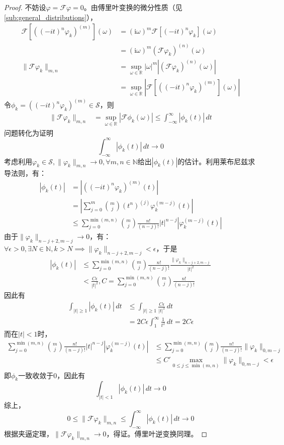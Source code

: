 \begin{proof}
    不妨设$\varphi=\mathcal{F} \varphi=0$。由傅里叶变换的微分性质（见\ref{sub:general_distributions}），
    \begin{align*}
    \mathcal{F}\left[\left((-it)^n\varphi_k\right)^{(m)}\right](\omega)&=(\mathrm{i}\omega)^m \mathcal{F}\left[(-it)^n \varphi_k\right](\omega)\\
    &=(\mathrm{i}\omega)^m (\mathcal{F} \varphi_k)^{(n)}(\omega)\\
    \|\mathcal{F} \varphi_k\|_{m,n}&=\sup_{\omega\in\mathbb{R} }|\omega|^m\left|(\mathcal{F} \varphi_k)^{(n)}(\omega)\right|\\
    &=\sup_{\omega\in\mathbb{R} }\left|\mathcal{F}\left[((-it)^n \varphi_k)^{(m)}\right](\omega)\right|
\end{align*}
令$\phi_k=\left((-it)^n \varphi_k\right)^{(m)}\in\mathcal{S} $，则
\begin{align*}
    \|\mathcal{F} \varphi_k\|_{m,n}&=\sup_{\omega\in\mathbb{R} }\left|\mathcal{F} \phi_k(\omega)\right|\leq \int_{-\infty}^{\infty}|\phi_k(t)|\,dt
\end{align*}
问题转化为证明\[\int_{-\infty}^{\infty}|\phi_k(t)|\,dt\to 0\]
考虑利用$\varphi_k\in\mathcal{S} ,\|\varphi_k\|_{m,n}\to 0,\forall m,n\in\mathbb{N}$给出$|\phi_k(t)|$的估计。利用莱布尼兹求导法则，有：
\begin{align*}
    |\phi_k(t)|&=\left|\left((-it)^n \varphi_k\right)^{(m)}(t)\right|\\
&=\left|\sum_{j=0}^{m}\binom{m}{j}(t^n)^{(j)}\varphi_k^{(m-j)}(t)\right|\\
    &\leq \sum_{j=0}^{\min(m,n)}\binom{m}{j}\frac{n!}{(n-j)!}|t|^{n-j}\left|\varphi_k^{(m-j)}(t)\right|
\end{align*}
由于$\|\varphi_k\|_{n-j+2,m-j}\to 0$，有：$\forall \epsilon>0,\exists N\in\mathbb{N},k>N\implies \|\varphi_k\|_{n-j+2,m-j}<\epsilon$，于是
\begin{align*}
    |\phi_k(t)|&\leq \sum_{j=0}^{\min(m,n)}\binom{m}{j}\frac{n!}{(n-j)!}\frac{\|\varphi_k\|_{n-j+2,m-j}}{|t|^2}\\
    &<\frac{C\epsilon}{|t|^2},C=\sum_{j=0}^{\min(m,n)}\binom{m}{j}\frac{n!}{(n-j)!}
\end{align*}
因此有\begin{align*}
    \int_{|t|\geq 1}|\phi_k(t)|\,dt&\leq \int_{|t|\geq 1}\frac{C\epsilon}{|t|^2}\,dt\\
    &=2C\epsilon\int_{1}^{\infty}\frac{1}{t^2}\,dt=2C\epsilon
\end{align*}
而在$|t|<1$时，\begin{align*}
    \sum_{j=0}^{\min(m,n)}\binom{m}{j}\frac{n!}{(n-j)!}|t|^{n-j}\left|\varphi_k^{(m-j)}(t)\right|&\leq \sum_{j=0}^{\min(m,n)}\binom{m}{j}\frac{n!}{(n-j)!}\|\varphi_k\|_{0,m-j}\\
    &\leq C'\max_{0\leq j\leq \min(m,n)}\|\varphi_k\|_{0,m-j}<\epsilon
\end{align*}
即$\phi_k$一致收敛于0，因此有
\[\int_{|t|<1}|\phi_k(t)|\,dt\to 0\]
综上，\[0\leq\|\mathcal{F} \varphi_k\|_{m,n}\leq\int_{-\infty}^{\infty}|\phi_k(t)|\,dt\to 0\]
根据夹逼定理，$\|\mathcal{F} \varphi_k\|_{m,n}\to 0$，得证。傅里叶逆变换同理。
\end{proof}

